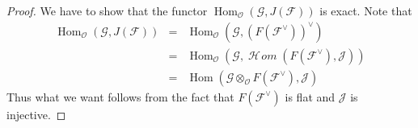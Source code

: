 \documentclass[10pt,a4paper]{amsart}
\theoremstyle{plain}
\theoremstyle{definition}
\theoremstyle{remark}
\numberwithin{equation}{subsection}
\def\Hom{\mathop{\mathrm{Hom}}\nolimits}
\def\SheafHom{\mathop{\mathcal{H}\!\mathit{om}}\nolimits}
\begin{document}
\begin{proof}
We have to show that the functor
$\Hom_\mathcal{O}(\mathcal{G}, J(\mathcal{F}))$
is exact. Note that
\begin{eqnarray*}
\Hom_\mathcal{O}(\mathcal{G}, J(\mathcal{F}))
& = &
\Hom_\mathcal{O}(\mathcal{G}, (F(\mathcal{F}^\vee))^\vee) \\
& = &
\Hom_\mathcal{O}
(\mathcal{G}, \SheafHom(F(\mathcal{F}^\vee), \mathcal{J})) \\
& = &
\Hom(\mathcal{G} \otimes_\mathcal{O} F(\mathcal{F}^\vee), \mathcal{J})
\end{eqnarray*}
Thus what we want follows from the fact that $F(\mathcal{F}^\vee)$
is flat and $\mathcal{J}$ is injective.
\end{proof}
\end{document}
